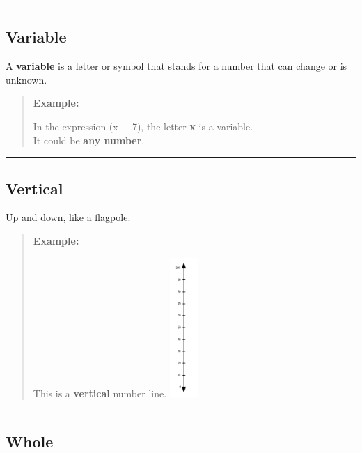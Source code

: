 \documentclass[
  letterpaper,
  DIV=11,
  numbers=noendperiod]{scrreprt}
\begin{document}
\begin{center}\rule{0.5\linewidth}{0.5pt}\end{center}

\subsection*{Variable}\label{glossary-variable}

A \textbf{variable} is a letter or symbol that stands for a number that
can change or is unknown.

\begin{quote}
\textbf{Example:}

In the expression (x + 7), the letter \textbf{x} is a variable.\\
It could be \textbf{any number}.
\end{quote}

\begin{center}\rule{0.5\linewidth}{0.5pt}\end{center}

\subsection*{Vertical}\label{glossary-vertical}

Up and down, like a flagpole.

\begin{quote}
\textbf{Example:}

This is a \textbf{vertical} number line.
\includegraphics[width=\linewidth,height=2.08333in,keepaspectratio]{images/Glossary/vertical_by_tens.png}
\end{quote}

\begin{center}\rule{0.5\linewidth}{0.5pt}\end{center}

\subsection*{Whole}\label{glossary-whole}
\end{document}
